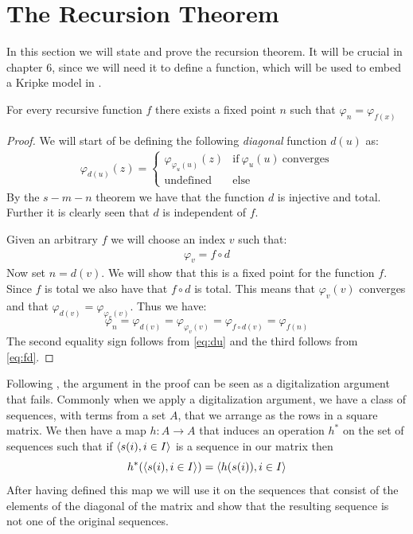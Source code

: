 \documentclass[../main.tex]{subfiles}
\begin{document}
\section{The Recursion Theorem}
In this section we will state and prove the recursion theorem. It will be
crucial in chapter 6, since we will need it to define a function, which will be
used to embed a Kripke model in \PRA.
\begin{thm}
	For every recursive function $f$ there exists a fixed point $n$ such
	that $\varphi_n=\varphi_{f(x)}$
\end{thm}
\begin{proof}
	We will start of be defining the following \textit{diagonal} function
	$d(u)$ as:
	\begin{align}
		\label{eq:du}
		\varphi_{d(u)}(z)=\begin{cases}
		\varphi_{\varphi_u(u)}(z)& \text{if}\ \varphi_u(u)\
		\text{converges}\\
		\text{undefined} & \text{else}
	\end{cases}
	\end{align}
	By the $s-m-n$ theorem we have that the function $d$ is injective and
	total. Further it is clearly seen that $d$ is independent of $f$.

	Given an arbitrary $f$ we will choose an index $v$ such that:
	\begin{align}
		\label{eq:fd}
		\varphi_v=f\circ d
	\end{align}
	Now set $n=d(v)$. We will show that this is a fixed point for the
	function $f$. Since $f$ is total we also have that $f\circ d$ is total.
	This means that $\varphi_v(v)$ converges and that
	$\varphi_{d(v)}=\varphi_{\varphi_v(v)}$. Thus we have:
	\[\varphi_n=\varphi_{d(v)}=\varphi_{\varphi_v(v)}=\varphi_{f\circ
	d(v)}=\varphi_{f(n)}\]
	The second equality sign follows from \ref{eq:du} and the third follows
	from \ref{eq:fd}.
\end{proof}
Following \citet{Owen1973}, the argument in the proof can be seen as a
digitalization argument that fails. Commonly when we apply a digitalization
argument, we have a class of sequences, with terms from a set $A$, that we arrange as the rows in a square
matrix. We then have a map $h:A\rightarrow A$ that induces an operation $h^*$ on
the set of sequences such that if $\langle s(i),i\in I\rangle$ is a sequence in our
matrix then 
\[h^*(\langle s(i),i\in I\rangle)=\langle h(s(i)),i\in I\rangle\]
After having defined this map we will use it on the sequences that consist of
the elements of the  diagonal of the matrix and
show that the resulting sequence is not one of the original sequences. 
\end{document}
